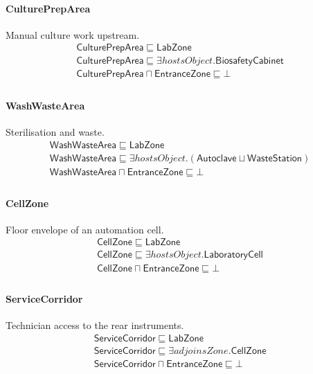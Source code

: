 \documentclass[10pt]{article}
\begin{document}
\paragraph{CulturePrepArea} Manual culture work upstream.
\[\begin{array}{l}
\mathsf{CulturePrepArea} \sqsubseteq  \mathsf{LabZone} \\
\mathsf{CulturePrepArea} \sqsubseteq  \exists \mathit{hostsObject}.\mathsf{BiosafetyCabinet} \\
\mathsf{CulturePrepArea} \sqcap  \mathsf{EntranceZone} \sqsubseteq  \bot  \\
\end{array}\]
\paragraph{WashWasteArea} Sterilisation and waste.
\[\begin{array}{l}
\mathsf{WashWasteArea} \sqsubseteq  \mathsf{LabZone} \\
\mathsf{WashWasteArea} \sqsubseteq  \exists \mathit{hostsObject}.(\mathsf{Autoclave} \sqcup  \mathsf{WasteStation}) \\
\mathsf{WashWasteArea} \sqcap  \mathsf{EntranceZone} \sqsubseteq  \bot  \\
\end{array}\]
\paragraph{CellZone} Floor envelope of an automation cell.
\[\begin{array}{l}
\mathsf{CellZone} \sqsubseteq  \mathsf{LabZone} \\
\mathsf{CellZone} \sqsubseteq  \exists \mathit{hostsObject}.\mathsf{LaboratoryCell} \\
\mathsf{CellZone} \sqcap  \mathsf{EntranceZone} \sqsubseteq  \bot  \\
\end{array}\]
\paragraph{ServiceCorridor} Technician access to the rear instruments.
\[\begin{array}{l}
\mathsf{ServiceCorridor} \sqsubseteq  \mathsf{LabZone} \\
\mathsf{ServiceCorridor} \sqsubseteq  \exists \mathit{adjoinsZone}.\mathsf{CellZone} \\
\mathsf{ServiceCorridor} \sqcap  \mathsf{EntranceZone} \sqsubseteq  \bot  \\
\end{array}\]
\end{document}
